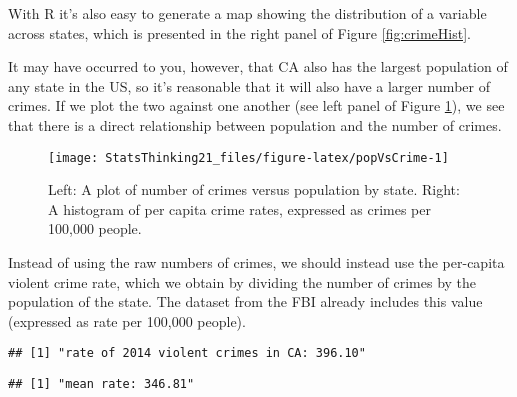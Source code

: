 \documentclass[]{book}
\newenvironment{Shaded}{\begin{snugshade}}{\end{snugshade}}
\newcommand{\KeywordTok}[1]{\textcolor[rgb]{0.13,0.29,0.53}{\textbf{#1}}}
\newcommand{\StringTok}[1]{\textcolor[rgb]{0.31,0.60,0.02}{#1}}
\newcommand{\CommentTok}[1]{\textcolor[rgb]{0.56,0.35,0.01}{\textit{#1}}}
\newcommand{\OperatorTok}[1]{\textcolor[rgb]{0.81,0.36,0.00}{\textbf{#1}}}
\newcommand{\NormalTok}[1]{#1}
\theoremstyle{definition}
\theoremstyle{definition}
\theoremstyle{definition}
\theoremstyle{remark}
\begin{document}
With R it's also easy to generate a map showing the distribution of a
variable across states, which is presented in the right panel of Figure
\ref{fig:crimeHist}.

It may have occurred to you, however, that CA also has the largest
population of any state in the US, so it's reasonable that it will also
have a larger number of crimes. If we plot the two against one another
(see left panel of Figure \ref{fig:popVsCrime}), we see that there is a
direct relationship between population and the number of crimes.

\begin{figure}
\texttt{[image: StatsThinking21\_files/figure-latex/popVsCrime-1]} \caption{Left: A plot of number of crimes versus population by state. Right: A histogram of per capita crime rates, expressed as crimes per 100,000 people.}\label{fig:popVsCrime}
\end{figure}

Instead of using the raw numbers of crimes, we should instead use the
per-capita violent crime rate, which we obtain by dividing the number of
crimes by the population of the state. The dataset from the FBI already
includes this value (expressed as rate per 100,000 people).

\begin{Shaded}
\end{Shaded}

\begin{verbatim}
## [1] "rate of 2014 violent crimes in CA: 396.10"
\end{verbatim}

\begin{Shaded}
\end{Shaded}

\begin{verbatim}
## [1] "mean rate: 346.81"
\end{verbatim}
\end{document}
